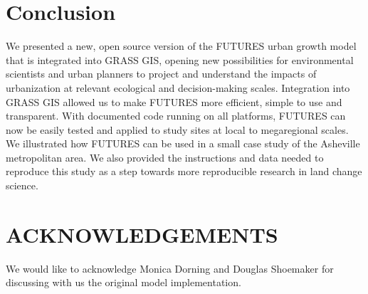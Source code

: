 \documentclass{isprs}
\begin{document}
\section{Conclusion}
We presented a new, open source version of the FUTURES urban growth model that is 
integrated into GRASS GIS,
opening new possibilities
for environmental scientists
and urban planners to 
project and understand the impacts of urbanization at relevant ecological and decision-making scales.
Integration into GRASS GIS allowed us to make FUTURES more efficient,
simple to use and transparent.
With documented code running on all platforms, FUTURES can now be easily tested
and applied to study sites at local to megaregional scales.
We illustrated how FUTURES can be used in a small case study of the Asheville metropolitan area.
We also provided the instructions and data 
needed to reproduce this study 
as a step towards more reproducible research in land change science.


\section*{ACKNOWLEDGEMENTS}\label{ACKNOWLEDGEMENTS}
We would like to acknowledge Monica Dorning and Douglas Shoemaker
for discussing with us the original model implementation.

 {%
 	\begin{spacing}{0.9}%
 	\end{spacing}
 }
\end{document}
